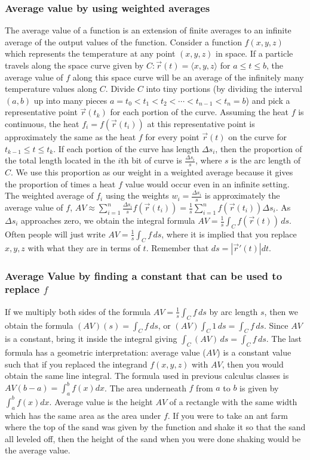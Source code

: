 \subsubsection{Average value by using weighted averages}
The average value of a function is an extension of finite averages to
an infinite average of the output values of the function. Consider a
function $f(x,y,z)$ which represents the temperature at any point
$(x,y,z)$ in space. If a particle travels along the space curve given
by $C\colon\vec r (t)=\langle x,y,z\rangle$ for $a\leq t\leq b$, the average value
of $f$ along this space curve will be an average of the infinitely
many temperature values along $C$. Divide $C$ into tiny portions (by
dividing the interval $(a,b)$ up into many pieces
$a=t_0<t_1<t_2<\cdots<t_{n-1}<t_n=b$) and pick a representative point 
 $\vec r(t_k)$ for each portion of the curve. Assuming the heat
$f$ is continuous, the heat 
$f_{i}=f(\vec r(t_i))$ at this representative point 
is approximately the same as the heat $f$ for every point $\vec r(t)$
on the curve for $t_{k-1}\leq t\leq t_{k}$. If each portion of the curve has
length $\Delta s_i$, then the proportion of the total length located in the
$i$th bit of curve is $\frac{\Delta s_{i}}{s}$, where $s$ is the arc length
of $C$. We use this proportion as our weight in a weighted average
because it gives the proportion of times a heat $f$ value would occur
even in an infinite setting. The weighted average of $f_{i}$ using the
weights $w_{i}=\frac{\Delta s_{i}}{s}$ is approximately the average value
of $f$, 
$AV\approx \sum_{i=1}^n \frac{\Delta s_{i}}{s}f(\vec r(t_i)) 
= \frac{1}{s} \sum_{i=1}^n f(\vec r(t_i)) \Delta s_{i}$. As $\Delta s_{i}$
approaches zero, we obtain the integral formula $AV=\frac{1}{s}\int_C
f(\vec r(t))\,ds$. Often people will just write $AV=\frac{1}{s}\int_C f
\,ds$, where it is implied that you replace $x,y,z$ with what they are
in terms of $t$.  Remember that $ds = |\vec r'(t)|dt$. 

\subsubsection{Average Value by finding a constant that can be used to
replace $f$}
If we multiply both sides of the formula $AV=\frac{1}{s}\int_C f \,ds$ by
arc length $s$, then we obtain the formula $(AV)(s) = \int_C f \,ds$, or
$(AV)\int_C 1 \,ds = \int_C f \,ds$. Since $AV$ is a constant, bring it inside
the integral giving $\int_C (AV) \,ds = \int_C f \,ds$.  The last formula has a
geometric interpretation: average value ($AV$) is a constant value
such that if you replaced the integrand $f(x,y,z)$ with $AV$, then you
would obtain the same line integral. The formula used in previous calculus classes is
$AV (b-a) =\int_a^b f(x)dx$. The area underneath $f$ from $a$ to $b$ is
given by $\int_a^b f(x)dx$. Average value is the height $AV$ of a
rectangle with the same width which has the same area as the area
under $f$.  If you were to take an ant farm where the top of the sand
was given by the function and shake it so that the sand all leveled
off, then the height of the sand when you were done shaking would be
the average value.  

